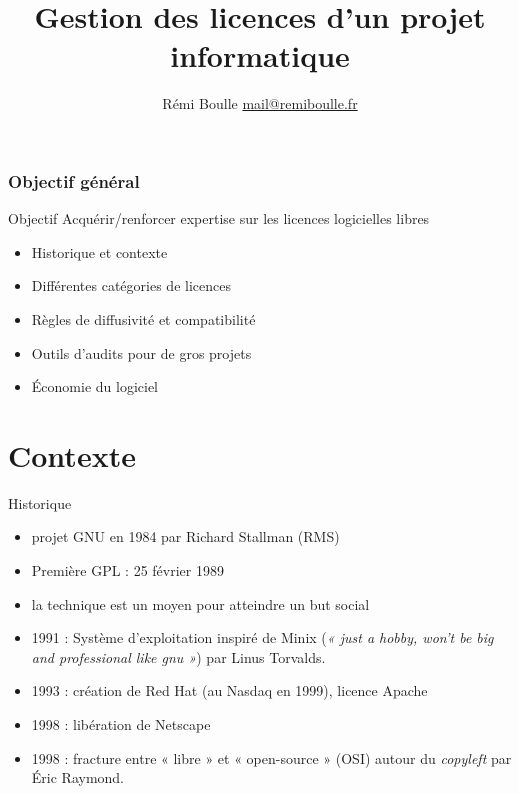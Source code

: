 \documentclass{beamer}
\title[]{Gestion des licences d'un projet informatique}
\author{Rémi Boulle  \href{mailto:mail@remiboulle.fr}{mail@remiboulle.fr}}
\date{}
\institute{}
\begin{document}


\begin{frame}
  \titlepage
\end{frame}



\begin{frame}
\frametitle{Objectif g\'en\'eral}
\begin{alertblock}{Objectif}
  Acquérir/renforcer expertise sur les licences logicielles libres
\end{alertblock}


  \begin{itemize}
  \item Historique et contexte
  \item Différentes catégories de licences
  \item Règles de diffusivité et compatibilité
  \item Outils d'audits pour de gros projets
  \item Économie du logiciel
  \end{itemize}
\end{frame}


\section{Contexte}

\begin{frame}{Historique}
  \begin{itemize}
  \item projet GNU en 1984 par Richard Stallman (RMS)
  \item Première GPL : 25 février 1989
  \item la technique est un moyen pour atteindre un but social
  \item 1991 : Système d'exploitation inspiré de Minix (\textit{« just a hobby, won’t be big and professional like gnu »}) par Linus Torvalds.
  \item 1993 : création de Red Hat (au Nasdaq en 1999), licence Apache
  \item 1998 : libération de Netscape
  \item 1998 : fracture entre « libre » et « open-source » (OSI) autour du \textit{copyleft} par Éric Raymond.
  \end{itemize}
\end{frame}
\end{document}
